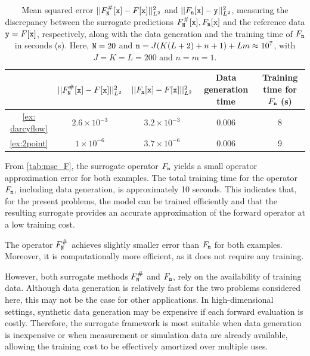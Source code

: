 \documentclass[10pt]{article}
\numberwithin{equation}{section}
\theoremstyle{nonumberplain}
\newcommand{\y}{{\tt y}}
\newcommand{\n}{{\tt n}}
\newcommand{\x}{{\tt x}}
\newcommand{\no}{{\tt N}}
\begin{document}
\begin{table}[H]
    \centering \footnotesize
    \begin{tabular}{c|c|c|c|c}
        & $||F_\no^\#[\x] - F[\x]||_{L^2}^2$ &  $||F_\n[\x] - F[\x]||_{L^2}^2$ & Data generation time &  Training time for $F_\n$ (s) \\ \hline
         \autoref{ex: darcyflow} & $2.6 \times 10^{-3}$ & $3.2 \times 10^{-3}$ & $0.006$ & 8 \\ 
         \autoref{ex:2point} & $1 \times 10^{-6}$ & $3.7 \times 10^{-6}$ & $0.006$ &  9\\
    \end{tabular}
    \caption{Mean squared error $||F_\no^\#[\x] - F[\x]||_{L^2}^2$ and $||F_\n[\x] - \y||_{L^2}^2$, measuring the discrepancy between the surrogate predictions $F_\no^\#[\x], F_\n[\x]$ and the reference data $\y=F[\x]$, respectively, along with the data generation and the training time of $F_\n$ in seconds (s). Here, $\no = 20$ and $\n = J(K(L + 2) + n + 1) + Lm \approx 10^{7}$, with $J = K = L = 200$ and $n = m = 1$.}
    \label{tab:mse_F}
\end{table}

From \autoref{tab:mse_F}, the surrogate operator $F_\n$ yields a small operator approximation error for both examples. The total training time for the operator $F_\n$, including data generation, is approximately 10 seconds. This indicates that, for the present problems, the model can be trained efficiently and that the resulting surrogate provides an accurate approximation of the forward operator at a low training cost.

The operator $F_\no^\#$ achieves slightly smaller error than $F_\n$ for both examples. Moreover, it is computationally more efficient, as it does not require any training.

However, both surrogate methods $F_\no^\#$ and $F_\n$, rely on the availability of training data. Although data generation is relatively fast for the two problems considered here, this may not be the case for other applications. In high-dimensional settings, synthetic data generation may be expensive if each forward evaluation is costly. Therefore, the surrogate framework is most suitable when data generation is inexpensive or when measurement or simulation data are already available, allowing the training cost to be effectively amortized over multiple uses.
\end{document}
